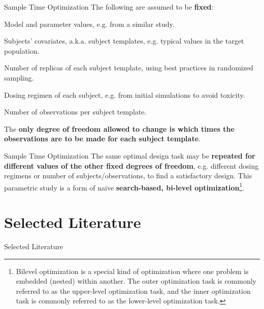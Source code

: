 \documentclass[aspectratio=169]{beamer}                    %
\begin{document}
\begin{frame}{Sample Time Optimization}
	The following are assumed to be \textbf{fixed}:
	\begin{vfilleditems}
		\item Model and parameter values, e.g. from a similar study.
		\item Subjects' covariates, a.k.a. subject templates, e.g.
		typical values in the target population.
		\item Number of replicas of each subject template,
		using best practices in randomized sampling.
		\item Dosing regimen of each subject,
		e.g. from initial simulations to avoid toxicity.
		\item Number of observations per subject template.
	\end{vfilleditems}
	The \textbf{only degree of freedom allowed to change is which times the observations
	are to be made for each subject template}.
\end{frame}

\begin{frame}{Sample Time Optimization}
	The same optimal design task may be \textbf{repeated for different values of the
	other fixed degrees of freedom},
	e.g. different dosing regimens or number of subjects/observations,
	to find a satisfactory design.
	\vfill
	This parametric study is a form of naive
	\textbf{search-based, bi-level optimization}\footnote{
		Bilevel optimization is a special kind of optimization where one problem is embedded (nested) within another.
		The outer optimization task is commonly referred to as the upper-level optimization task,
		and the inner optimization task is commonly referred to as the lower-level optimization task.}.
\end{frame}

\section{Selected Literature}
\begin{frame}[allowframebreaks]{Selected Literature}
	\printbibliography
\end{frame}

\end{document}
